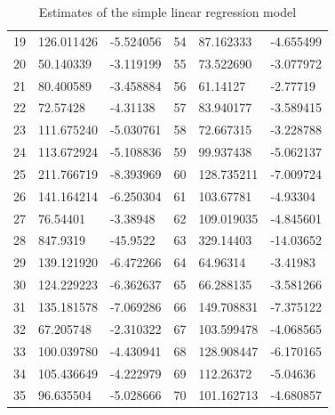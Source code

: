 \begin{table}[H]
\begin{tabular}{c:ll|c:ll}
        19 & 126.011426 & -5.524056 & 54 & 87.162333 & -4.655499\\ 
        20 & 50.140339 & -3.119199 & 55 & 73.522690 & -3.077972\\ 
        21 & 80.400589 & -3.458884& 56 & 61.14127 & -2.77719\\ 
        22 & 72.57428 & -4.31138 & 57 & 83.940177 & -3.589415\\ 
        23 & 111.675240 & -5.030761 & 58 & 72.667315 & -3.228788\\ 
        24 & 113.672924 & -5.108836 & 59 & 99.937438 & -5.062137\\ 
        25 & 211.766719 & -8.393969 & 60 & 128.735211 & -7.009724\\ 
        26 & 141.164214 & -6.250304 & 61 & 103.67781 & -4.93304\\ 
        27 & 76.54401 & -3.38948 & 62 & 109.019035 &-4.845601\\ 
        28 & 847.9319 & -45.9522 & 63 & 329.14403 & -14.03652\\ 
        29 & 139.121920 & -6.472266 & 64 & 64.96314 & -3.41983\\ 
        30 & 124.229223 & -6.362637 & 65 & 66.288135 & -3.581266\\ 
        31 & 135.181578 & -7.069286 & 66 & 149.708831 & -7.375122\\ 
        32 & 67.205748 & -2.310322 & 67 & 103.599478 & -4.068565\\ 
        33 & 100.039780 & -4.430941 & 68 & 128.908447 & -6.170165 \\ 
        34 & 105.436649 & -4.222979 & 69 & 112.26372 & -5.04636 \\ 
        35 & 96.635504 & -5.028666 & 70 & 101.162713 & -4.680857\\
        \hline
    \end{tabular}
    \caption{Estimates of the simple linear regression model}
    \label{tab: est_simple_lm}
\end{table}

